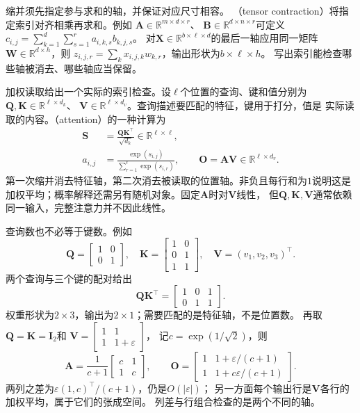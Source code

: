缩并须先指定参与求和的轴，并保证对应尺寸相容。
（tensor contraction）将指定索引对齐相乘再求和。例如
$\bm A\in\mathbb R^{m\times d\times r}$、
$\bm B\in\mathbb R^{d\times n\times r}$可定义
$c_{i,j}=\sum_{k=1}^d\sum_{s=1}^r a_{i,k,s}b_{k,j,s}$。
对$\bm X\in\mathbb R^{b\times\ell\times d}$的最后一轴应用同一矩阵
$\bm W\in\mathbb R^{d\times h}$，则
$z_{i,j,r}=\sum_k x_{i,j,k}w_{k,r}$，输出形状为$b\times\ell\times h$。
写出索引能检查哪些轴被消去、哪些轴应当保留。


加权读取给出一个实际的索引检查。设$\ell$个位置的查询、键和值分别为
$\bm Q,\bm K\in\mathbb R^{\ell\times d_k}$、
$\bm V\in\mathbb R^{\ell\times d_v}$。查询描述要匹配的特征，键用于打分，值是
实际读取的内容。（attention）的一种计算为
\begin{align}
 \bm S&=\frac{\bm Q\bm K^\top}{\sqrt{d_k}}\in\mathbb R^{\ell\times\ell},
 \label{eq:linear-algebra-attention-scores}\\
 a_{i,j}&=\frac{\exp(s_{i,j})}{\sum_{r=1}^{\ell}\exp(s_{i,r})},
 \qquad\bm O=\bm A\bm V\in\mathbb R^{\ell\times d_v}.
 \label{eq:linear-algebra-attention-contraction}
\end{align}
第一次缩并消去特征轴，第二次消去被读取的位置轴。非负且每行和为$1$说明这是
加权平均；概率解释还需另有随机对象。固定$\bm A$时对$\bm V$线性，
但$\bm Q,\bm K,\bm V$通常依赖同一输入，完整注意力并不因此线性。

查询数也不必等于键数。例如
\[
 \bm Q=\begin{bmatrix}1&0\\0&1\end{bmatrix},\quad
 \bm K=\begin{bmatrix}1&0\\0&1\\1&1\end{bmatrix},\quad
 \bm V=(v_1,v_2,v_3)^\top.
\]
两个查询与三个键的配对给出
\[
 \bm Q\bm K^\top=\begin{bmatrix}1&0&1\\0&1&1\end{bmatrix}.
\]
权重形状为$2\times3$，输出为$2\times1$；需要匹配的是特征轴，不是位置数。
再取$\bm Q=\bm K=\bm I_2$和
$\bm V=\left[\begin{smallmatrix}1&1\\1&1+\varepsilon\end{smallmatrix}\right]$，
记$c=\exp(1/\sqrt2)$，则
\[
 \bm A=\frac1{c+1}\begin{bmatrix}c&1\\1&c\end{bmatrix},\qquad
 \bm O=\begin{bmatrix}
 1&1+\varepsilon/(c+1)\\1&1+c\varepsilon/(c+1)
 \end{bmatrix}.
\]
两列之差为$\varepsilon(1,c)^\top/(c+1)$，仍是$O(|\varepsilon|)$；
另一方面每个输出行是$\bm V$各行的加权平均，属于它们的张成空间。
列差与行组合检查的是两个不同的轴。


